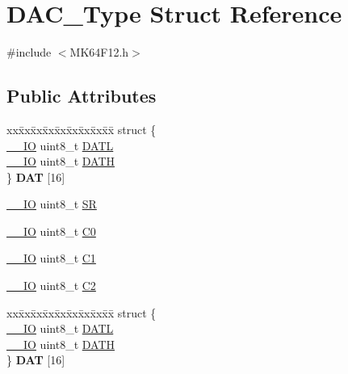 \hypertarget{structDAC__Type}{}\section{D\+A\+C\+\_\+\+Type Struct Reference}
\label{structDAC__Type}


{\ttfamily \#include $<$M\+K64\+F12.\+h$>$}

\subsection*{Public Attributes}
\begin{DoxyCompactItemize}
\item 
\begin{tabbing}
xx\=xx\=xx\=xx\=xx\=xx\=xx\=xx\=xx\=\kill
struct \{\\
\>\hyperlink{core__sc300_8h_aec43007d9998a0a0e01faede4133d6be}{\_\_IO} uint8\_t \hyperlink{structDAC__Type_a0f61f3cd5d904066d9050e97aab24734}{DATL}\\
\>\hyperlink{core__sc300_8h_aec43007d9998a0a0e01faede4133d6be}{\_\_IO} uint8\_t \hyperlink{structDAC__Type_ad8322a8c7a81901521c43219cb6fbca6}{DATH}\\
\} {\bfseries DAT} \mbox{[}16\mbox{]}\hypertarget{structDAC__Type_a1b298b69ce60b5b7719a74eeed87e492}{}\label{structDAC__Type_a1b298b69ce60b5b7719a74eeed87e492}
\\

\end{tabbing}\item 
\hyperlink{core__sc300_8h_aec43007d9998a0a0e01faede4133d6be}{\+\_\+\+\_\+\+IO} uint8\+\_\+t \hyperlink{structDAC__Type_acee3e246d2964c0a7165755319ad8d72}{SR}
\item 
\hyperlink{core__sc300_8h_aec43007d9998a0a0e01faede4133d6be}{\+\_\+\+\_\+\+IO} uint8\+\_\+t \hyperlink{structDAC__Type_a49f8406d0fa0efc705eb2c0c43ecf30c}{C0}
\item 
\hyperlink{core__sc300_8h_aec43007d9998a0a0e01faede4133d6be}{\+\_\+\+\_\+\+IO} uint8\+\_\+t \hyperlink{structDAC__Type_afb00f6857479eca5081afacc76b9b621}{C1}
\item 
\hyperlink{core__sc300_8h_aec43007d9998a0a0e01faede4133d6be}{\+\_\+\+\_\+\+IO} uint8\+\_\+t \hyperlink{structDAC__Type_a4128157a759ed11a7ac5b3daf56cd7d2}{C2}
\item 
\begin{tabbing}
xx\=xx\=xx\=xx\=xx\=xx\=xx\=xx\=xx\=\kill
struct \{\\
\>\hyperlink{core__sc300_8h_aec43007d9998a0a0e01faede4133d6be}{\_\_IO} uint8\_t \hyperlink{structDAC__Type_a0f61f3cd5d904066d9050e97aab24734}{DATL}\\
\>\hyperlink{core__sc300_8h_aec43007d9998a0a0e01faede4133d6be}{\_\_IO} uint8\_t \hyperlink{structDAC__Type_ad8322a8c7a81901521c43219cb6fbca6}{DATH}\\
\} {\bfseries DAT} \mbox{[}16\mbox{]}\hypertarget{structDAC__Type_a0c4d4b384cbe8db6052412dd3977203c}{}\label{structDAC__Type_a0c4d4b384cbe8db6052412dd3977203c}
\\

\end{tabbing}\end{DoxyCompactItemize}


